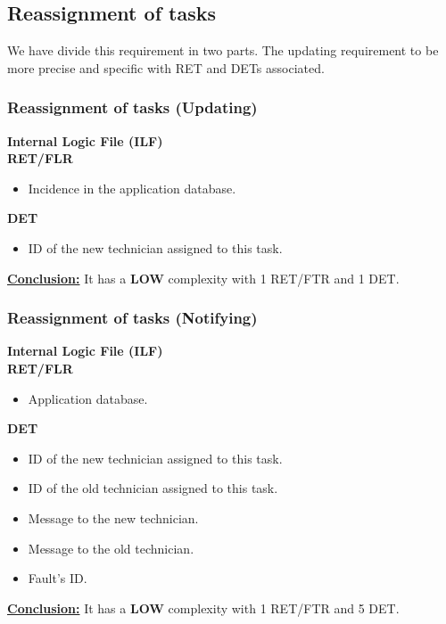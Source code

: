 \subsection{Reassignment of tasks }
We have divide this requirement in two parts. The updating requirement to be more precise and specific with RET and DETs associated.
\subsubsection{Reassignment of tasks (Updating)}
\textbf{Internal Logic File (ILF)} \\ 
\textbf{RET/FLR}
\begin{itemize}
\item Incidence in the application database.
\end{itemize}
\textbf{DET}
\begin{itemize}
\item ID of the new technician assigned to this task.
\end{itemize}
\textbf{\underline{Conclusion:}} It has a \textbf{LOW} complexity with 1 RET/FTR and 1 DET.

\subsubsection{Reassignment of tasks (Notifying)}
\textbf{Internal Logic File (ILF)} \\ 
\textbf{RET/FLR}
\begin{itemize}
\item Application database.
\end{itemize}
\textbf{DET}
\begin{itemize}
\item ID of the new technician assigned to this task.
\item ID of the old technician assigned to this task.
\item Message to the new technician.
\item Message to the old technician.
\item Fault's ID.

\end{itemize}
\textbf{\underline{Conclusion:}} It has a \textbf{LOW} complexity with 1 RET/FTR and 5 DET.

